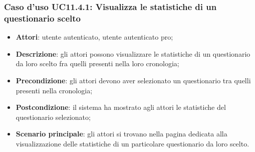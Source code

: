 \subsubsection{Caso d'uso UC11.4.1: Visualizza le statistiche di un questionario scelto}
\begin{itemize}
\item\textbf{Attori}: utente autenticato, utente autenticato pro;
\item\textbf{Descrizione}: gli attori possono visualizzare le statistiche di un questionario da loro scelto fra quelli presenti nella loro cronologia;
\item\textbf{Precondizione}: gli attori devono aver selezionato un questionario tra quelli presenti nella cronologia;
\item\textbf{Postcondizione}: il sistema ha mostrato agli attori le statistiche del questionario selezionato;
\item\textbf{Scenario principale}: gli attori si trovano nella pagina dedicata alla visualizzazione delle statistiche di un particolare questionario da loro scelto.
\end{itemize}

